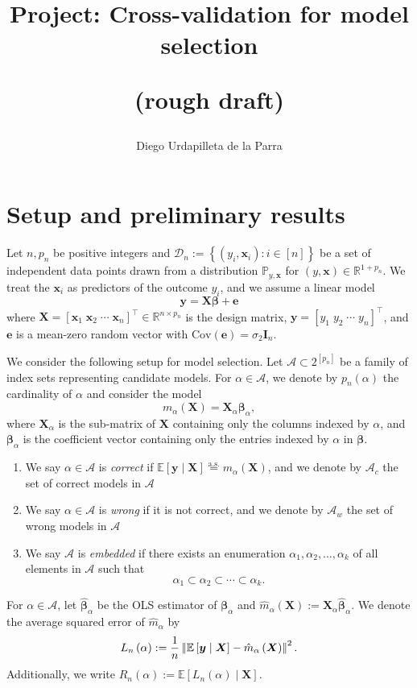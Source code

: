 \documentclass[12pt, letter paper]{article}
\title{Project: Cross-validation for model selection

(rough draft)}
\author{Diego Urdapilleta de la Parra}
\newcommand{\1}{\mathmybb{1}}
\newcommand{\R}{\mathbb{R}}
\newcommand{\0}{\emptyset}
\newcommand{\prob}{\mathbb{P}}
\newcommand{\Ep}[1]{\mathbb{E}\left[ #1 \right]}
\newcommand{\paren}[1]{\left(#1 \right)}
\newcommand{\sqbr}[1]{\left[#1 \right]}
\newcommand{\set}[1]{\left\{ #1 \right\}}
\newcommand{\norm}[1]{\left|\hspace{-1pt}\left|#1 \right|\hspace{-1pt}\right|}
\newcommand{\normsq}[1]{\norm{#1}^{2}}
\newcommand{\data}{\mathcal{D}_{n}}
\newcommand{\Acal}{\mathcal{A}}
\newcommand{\aseq}{\stackrel{\mathrm{a.s.}}{=}}
\newcommand{\X}{\boldsymbol{X}}
\newcommand{\x}{\boldsymbol{x}}
\newcommand{\y}{\boldsymbol{y}}
\newcommand{\e}{\boldsymbol{e}}
\newcommand{\Cov}[1]{\mathrm{Cov}\paren{#1}}
\newcommand{\bbeta}{\boldsymbol{\beta}}
\newcommand{\bbetahat}{\boldsymbol{\hat{\beta}}}
\newcommand{\Loss}[1]{L_{n}\paren{#1}}
\begin{document}
\maketitle
\section{Setup and preliminary results}
Let \(n,p_{n}\) be positive integers and \(\data := \set{\paren{y_{i}, \x_{i}}:i\in [n]}\) be a set of independent data points drawn from a distribution \(\prob_{y, \x}\) for \((y, \x)\in\R^{1+p_{n}}\). We treat the \(\x_{i}\) as predictors of the outcome \(y_{i}\), and we assume a linear model
\[\y = \X\bbeta + \e\]
where \(\X = {[\x_{1}\;\x_{2}\;\cdots\;\x_{n}]}^{\top}\in\R^{n\times p_{n}}\) is the design matrix, \(\y = \sqbr{y_{1}\; y_{2}\;\cdots\; y_{n}}^{\top}\), and \(\e\) is a mean-zero random vector with \(\Cov{\e} = \sigma_{2}\boldsymbol{I}_{n}\).

We consider the following setup for model selection. Let \(\Acal\subset2^{[p_{n}]}\) be a family of index sets representing candidate models. For \(\alpha\in\Acal\), we denote by \(p_{n}(\alpha)\) the cardinality of \(\alpha\) and consider the model
\[m_{\alpha}(\X) = \X_{\alpha}\bbeta_{\alpha},\]
where \(\X_{\alpha}\) is the sub-matrix of \(\X\) containing only the columns indexed by \(\alpha\), and \(\bbeta_{\alpha}\) is the coefficient vector containing only the entries indexed by \(\alpha\) in \(\bbeta\).
\begin{enumerate}
    \item We say \(\alpha\in\Acal\) is \emph{correct} if \(\Ep{\y\mid\X}\aseq m_{\alpha}(\X)\), and we denote by \(\Acal_{c}\) the set of correct models in \(\Acal\)
    \item We say \(\alpha\in\Acal\) is \emph{wrong} if it is not correct, and we denote by \(\Acal_{w}\) the set of wrong models in \(\Acal\)
    \item We say \(\Acal\) is \emph{embedded} if there exists an enumeration \(\alpha_{1}, \alpha_{2}, \ldots, \alpha_{k}\) of all elements in \(\Acal\) such that \[\alpha_{1}\subset\alpha_{2}\subset\cdots\subset\alpha_{k}.\]
\end{enumerate}

\begin{definition}
    For \(\alpha\in\Acal\), let \(\bbetahat_{\alpha}\) be the OLS estimator of \(\bbeta_{\alpha}\) and \(\hat{m}_{\alpha}(\X):=\X_{\alpha}\bbetahat_{\alpha}\). We denote the average squared error of \(\hat{m}_{\alpha}\) by
    \[\Loss{\alpha}:=\frac{1}{n}\normsq{\Ep{\y\mid\X} - \hat{m}_{\alpha}\paren{\X}}.\]
    Additionally, we write
    \(R_{n}(\alpha):= \Ep{\Loss{\alpha}\mid\X}\).
\end{definition}
\end{document}
